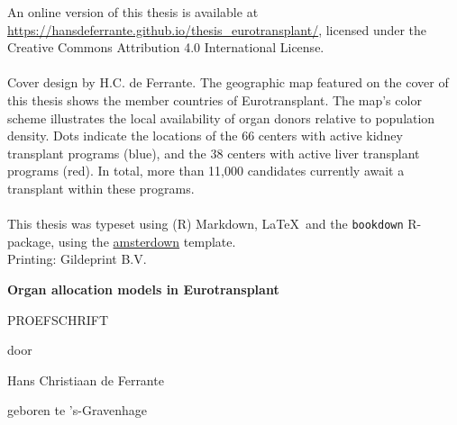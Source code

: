 \documentclass[11pt,twoside,]{book}
\begin{document}
An online version of this thesis is available at \url{https://hansdeferrante.github.io/thesis_eurotransplant/}, licensed under the Creative Commons Attribution 4.0 International License.
\\
\\
Cover design by H.C. de Ferrante. The geographic map featured on the cover of 
this thesis shows the member countries of Eurotransplant. The map's color 
scheme illustrates the local availability of organ donors relative to population
density. Dots indicate the locations of the 66 centers with active kidney transplant
programs (blue), and the 38 centers with active liver transplant programs (red). 
In total, more than 11,000 candidates currently await a transplant within these
programs.
\\
\\
This thesis was typeset using (R) Markdown, \LaTeX\ and the \verb+bookdown+ R-package, using the \href{https://lcreteig.github.io/amsterdown/}{amsterdown} template.\\

Printing: Gildeprint B.V.



\endgroup

\clearpage
\thispagestyle{empty}
\vspace*{\drop}
\begin{center}
\Huge\textbf{Organ allocation models in Eurotransplant}\par
\vfill %
\large \textsc{PROEFSCHRIFT}\par
\vspace{\baselineskip}
\par %
\vspace{\baselineskip}
{\large door}\par
\vspace{\baselineskip}
{\Large Hans Christiaan de Ferrante}\par
\vspace{\baselineskip}
{\large geboren te 's-Gravenhage}
\end{center}
\end{document}
